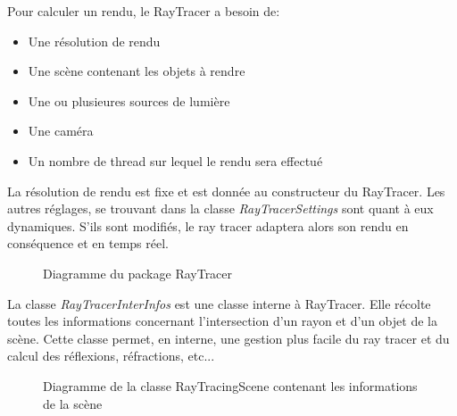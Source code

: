 \documentclass[../../Rapport RayTracer]{subfiles}
\begin{document}
Pour calculer un rendu, le RayTracer a besoin de:
\begin{itemize}
	\item{Une résolution de rendu}
	\item{Une scène contenant les objets à rendre}
	\item{Une ou plusieures sources de lumière}
	\item{Une caméra}
	\item{Un nombre de thread sur lequel le rendu sera effectué}
\end{itemize}
La résolution de rendu est fixe et est donnée au constructeur du RayTracer. Les autres réglages, se trouvant dans la classe \textit{RayTracerSettings} sont quant à eux dynamiques. S'ils sont modifiés, le ray tracer adaptera alors son rendu en conséquence et en temps réel.

\begin{figure}[h!]
	
	\caption{Diagramme du package RayTracer}
	\label{diagrammeRayTracer}
\end{figure}
\FloatBarrier

La classe \textit{RayTracerInterInfos} est une classe interne à RayTracer. Elle récolte toutes les informations concernant l'intersection d'un rayon et d'un objet de la scène. Cette classe permet, en interne, une gestion plus facile du ray tracer et du calcul des réflexions, réfractions, etc...

\begin{figure}[h!]
	
	\caption{Diagramme de la classe RayTracingScene contenant les informations de la scène}
	\label{diagrammeRayTracingScene}
\end{figure}
\FloatBarrier
\end{document}
